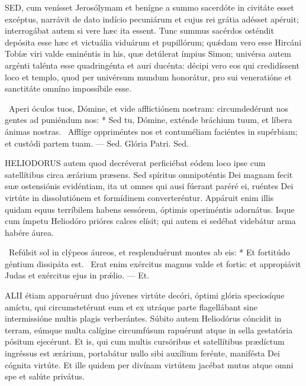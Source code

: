 \lettrine[lines=2]{S}{ED}, cum venísset Jerosólymam et benígne a summo sacerdóte in civitáte esset excéptus, narrávit de dato indício pecuniárum et cujus rei grátia adésset apéruit; interrogábat autem si vere hæc ita essent. Tunc summus sacérdos osténdit depósita esse hæc et victuália viduárum et pupillórum; quǽdam vero esse Hircáni Tobíæ viri valde eminéntis in his, quæ detúlerat ímpius Simon; univérsa autem argénti talénta esse quadringénta et auri ducénta: décipi vero eos qui credidíssent loco et templo, quod per univérsum mundum honorátur, pro sui veneratióne et sanctitáte omníno impossíbile esse.

\R\ Aperi óculos tuos, Dómine, et vide afflictiónem nostram: circumdedérunt nos gentes ad puniéndum nos: * Sed tu, Dómine, exténde bráchium tuum, et líbera ánimas nostras. \V\ Afflíge oppriméntes nos et contuméliam faciéntes in supérbiam; et custódi partem tuam. — Sed. Glória Patri. Sed.




\lettrine[lines=2]{H}{ELIODORUS} autem quod decréverat perficiébat eódem loco ipse cum satellítibus circa ærárium præsens. Sed spíritus omnipoténtis Dei magnam fecit suæ ostensiónis evidéntiam, ita ut omnes qui ausi fúerant paréré ei, ruéntes Dei virtúte in dissolutiónem et formídinem converteréntur. Appáruit enim illis quidam equus terríbilem habens sessórem, óptimis operiméntis adornátus. Isque cum ímpetu Heliodóro prióres calces elísit; qui autem ei sedébat videbátur arma habére áurea.

\R\ Refúlsit sol in clýpeos áureos, et resplenduérunt montes ab eis: * Et fortitúdo géntium dissipáta est. \V\ Erat enim exércitus magnus valde et fortis: et appropiávit Judas et exércitus ejus in prǽlio. — Et.


\lettrine[lines=2]{A}{LII} étiam apparuérunt duo júvenes virtúte decóri, óptimi glória speciosíque amíctu, qui circumstetérunt eum et ex utráque parte flagellábant sine intermissióne multis plagis verberántes. Súbito autem Heliodórus cóncidit in terram, eúmque multa calígine circumfúsum rapuérunt atque in sella gestatória pósitum ejecérunt. Et is, qui cum multis cursóribus et satellítibus prædíctum ingréssus est ærárium, portabátur nullo sibi auxílium ferénte, manifésta Dei cógnita virtúte. Et ille quidem per divínam virtútem jacébat mutus atque omni spe et salúte privátus.

